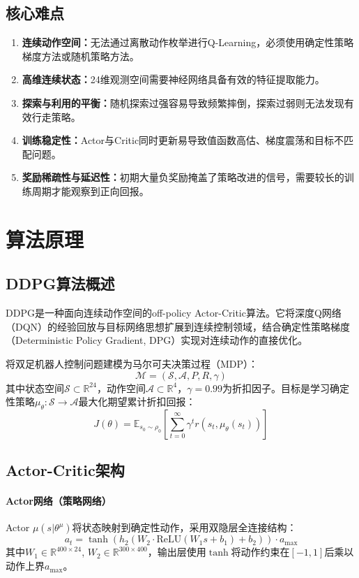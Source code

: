 \documentclass[UTF8,a4paper,12pt]{ctexart}
\begin{document}
\subsection{核心难点}

\begin{enumerate}[leftmargin=2em]
  \item \textbf{连续动作空间：}无法通过离散动作枚举进行Q-Learning，必须使用确定性策略梯度方法或随机策略方法。
  \item \textbf{高维连续状态：}24维观测空间需要神经网络具备有效的特征提取能力。
  \item \textbf{探索与利用的平衡：}随机探索过强容易导致频繁摔倒，探索过弱则无法发现有效行走策略。
  \item \textbf{训练稳定性：}Actor与Critic同时更新易导致值函数高估、梯度震荡和目标不匹配问题。
  \item \textbf{奖励稀疏性与延迟性：}初期大量负奖励掩盖了策略改进的信号，需要较长的训练周期才能观察到正向回报。
\end{enumerate}

\section{算法原理}

\subsection{DDPG算法概述}

DDPG\cite{lillicrap2015ddpg}是一种面向连续动作空间的off-policy Actor-Critic算法。它将深度Q网络（DQN）的经验回放与目标网络思想扩展到连续控制领域，结合确定性策略梯度（Deterministic Policy Gradient, DPG）\cite{silver2014dpg}实现对连续动作的直接优化。

将双足机器人控制问题建模为马尔可夫决策过程（MDP）：
\[
\mathcal{M} = (\mathcal{S}, \mathcal{A}, P, R, \gamma)
\]
其中状态空间$\mathcal{S} \subset \mathbb{R}^{24}$，动作空间$\mathcal{A} \subset \mathbb{R}^{4}$，$\gamma = 0.99$为折扣因子。目标是学习确定性策略$\mu_\theta: \mathcal{S} \to \mathcal{A}$最大化期望累计折扣回报：
\[
J(\theta) = \mathbb{E}_{s_0 \sim \rho_0}\left[\sum_{t=0}^{\infty} \gamma^t r(s_t, \mu_\theta(s_t))\right]
\]

\subsection{Actor-Critic架构}

\paragraph{Actor网络（策略网络）}
Actor $\mu(s|\theta^\mu)$将状态映射到确定性动作，采用双隐层全连接结构：
\begin{equation}
a_t = \tanh(h_2(W_2 \cdot \text{ReLU}(W_1 s + b_1) + b_2)) \cdot a_{\max}
\end{equation}
其中$W_1 \in \mathbb{R}^{400 \times 24}$, $W_2 \in \mathbb{R}^{300 \times 400}$，输出层使用$\tanh$将动作约束在$[-1,1]$后乘以动作上界$a_{\max}$。
\end{document}
